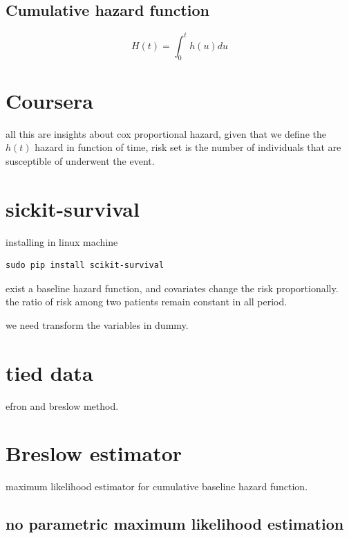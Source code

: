 \documentclass[10pt,a4paper]{article}
\begin{document}
\subsection{Cumulative hazard function}

\begin{equation}
H(t) = \int_{0}^{t} h(u) du
\end{equation}



\section{Coursera}
all this are insights about cox proportional hazard, given that we define the $h(t)$ hazard in function of time, risk set is the number of individuals that are susceptible of underwent the event.


\section{sickit-survival}
installing in linux machine 
\begin{verbatim}
sudo pip install scikit-survival
\end{verbatim}



exist a baseline hazard function, and covariates change the risk proportionally.
the ratio of risk among two patients remain constant in all period.



we need transform the variables in dummy.




\section{tied data}
efron and breslow method.





\section{Breslow estimator}
maximum likelihood estimator for cumulative baseline hazard function.

\subsection{no parametric maximum likelihood estimation}
\end{document}
